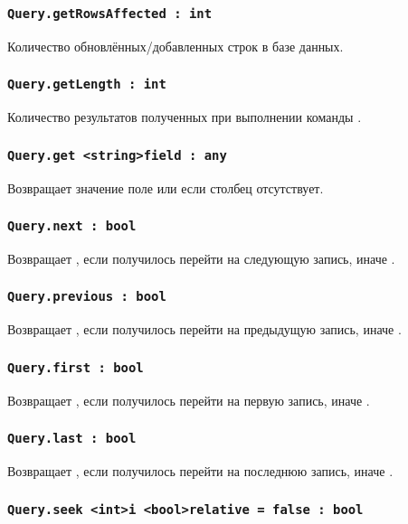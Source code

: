 \subsubsection{\lstinline|Query.getRowsAffected : int|}

Количество обновлённых/добавленных строк в базе данных.

\subsubsection{\lstinline|Query.getLength : int|}

Количество результатов полученных при выполнении команды .

\subsubsection{\lstinline|Query.get <string>field : any|}

Возвращает значение поле или \void{} если столбец  отсутствует.

\subsubsection{\lstinline|Query.next : bool|}

Возвращает \true, если получилось перейти на следующую запись, иначе \false.

\subsubsection{\lstinline|Query.previous : bool|}

Возвращает \true, если получилось перейти на предыдущую запись, иначе \false.

\subsubsection{\lstinline|Query.first : bool|}

Возвращает \true, если получилось перейти на первую запись, иначе \false.

\subsubsection{\lstinline|Query.last : bool|}

Возвращает \true, если получилось перейти на последнюю запись, иначе \false.

\subsubsection{\lstinline|Query.seek <int>i <bool>relative = false : bool|}

